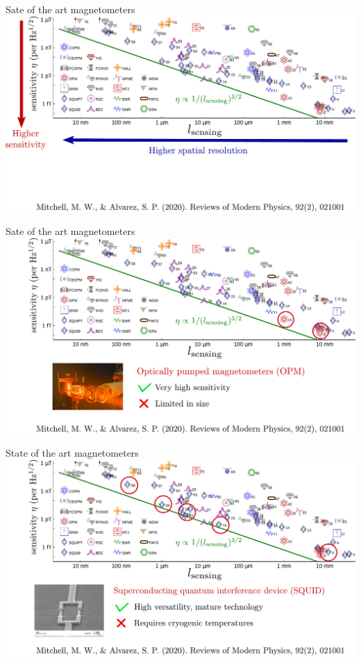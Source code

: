 \documentclass{beamer}
\begin{document}
\begin{frame}{Sate of the art magnetometers}
\centering
\includegraphics[width=\textwidth,height=0.85\textheight,keepaspectratio]{Slide_quantum_magnetometers_bare_1}
\end{frame}

\begin{frame}{Sate of the art magnetometers}
\centering
\includegraphics[width=\textwidth,height=0.85\textheight,keepaspectratio]{Slide_quantum_magnetometers_OPM}
\end{frame}

\begin{frame}{State of the art magnetometers}
\centering
\includegraphics[width=\textwidth,height=0.85\textheight,keepaspectratio]{Slide_quantum_magnetometers_SQUID}
\end{frame}
\end{document}
